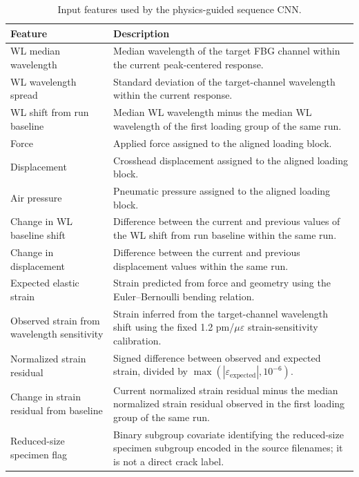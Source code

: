 \documentclass[notspecified,article,submit,pdftex,moreauthors]{Definitions/mdpi}
\newcommand{\rev}[1]{{\color{red}#1}}
\begin{document}
\begin{table}[H]
\small
\caption{Input features used by the physics-guided sequence CNN.\label{tab:input_summary}}
\begin{tabularx}{\textwidth}{>{\raggedright\arraybackslash}p{}X}
\toprule
\textbf{Feature} & \textbf{Description} \\
\midrule
WL median wavelength & Median wavelength of the target FBG channel within the current peak-centered response. \\
WL wavelength spread & Standard deviation of the target-channel wavelength within the current response. \\
WL shift from run baseline & Median WL wavelength minus the median WL wavelength of the first loading group of the same run. \\
Force & Applied force assigned to the aligned loading block. \\
Displacement & Crosshead displacement assigned to the aligned loading block. \\
Air pressure & Pneumatic pressure assigned to the aligned loading block. \\
Change in WL baseline shift & Difference between the current and previous values of the WL shift from run baseline within the same run. \\
Change in displacement & Difference between the current and previous displacement values within the same run. \\
Expected elastic strain & Strain predicted from force and geometry using the Euler--Bernoulli bending relation. \\
Observed strain from wavelength sensitivity & \rev{Strain inferred from the target-channel wavelength shift using the fixed 1.2 pm/$\mu\varepsilon$ strain-sensitivity calibration.} \\
Normalized strain residual & \rev{Signed difference between observed and expected strain, divided by $\max(|\varepsilon_{\mathrm{expected}}|,10^{-6})$.} \\
Change in strain residual from baseline & \rev{Current normalized strain residual minus the median normalized strain residual observed in the first loading group of the same run.} \\
Reduced-size specimen flag & \rev{Binary subgroup covariate identifying the reduced-size specimen subgroup encoded in the source filenames; it is not a direct crack label.} \\
\bottomrule
\end{tabularx}
\end{table}
\end{document}
